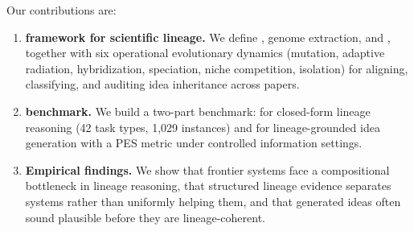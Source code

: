 Our contributions are:
\begin{enumerate}[noitemsep,topsep=2pt]
\item \textbf{\ideagene{} framework for scientific lineage.} We define \genome{}, genome extraction, and \genomediff{}, together with six operational evolutionary dynamics (mutation, adaptive radiation, hybridization, speciation, niche competition, isolation) for aligning, classifying, and auditing idea inheritance across papers.
\item \textbf{\igbench{} benchmark.} We build a two-part benchmark: \geneexam{} for closed-form lineage reasoning (42 task types, 1,029 instances) and \genearena{} for lineage-grounded idea generation with a PES metric under controlled information settings.
\item \textbf{Empirical findings.} We show that frontier systems face a compositional bottleneck in lineage reasoning, that structured lineage evidence separates systems rather than uniformly helping them, and that generated ideas often sound plausible before they are lineage-coherent.
\end{enumerate}
